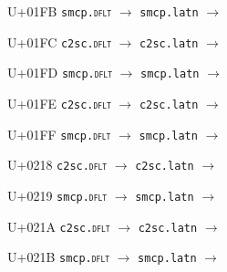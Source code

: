 \documentclass{article}
\begin{document}
\begin{substitutions}
\goodbreak

U+01FB  \linebreak
    \texttt{smcp.\textsc{dflt}} $\to$  \linebreak
    \texttt{smcp.latn} $\to$  

\goodbreak

U+01FC  \linebreak
    \texttt{c2sc.\textsc{dflt}} $\to$  \linebreak
    \texttt{c2sc.latn} $\to$  

\goodbreak

U+01FD  \linebreak
    \texttt{smcp.\textsc{dflt}} $\to$  \linebreak
    \texttt{smcp.latn} $\to$  

\goodbreak

U+01FE  \linebreak
    \texttt{c2sc.\textsc{dflt}} $\to$  \linebreak
    \texttt{c2sc.latn} $\to$  

\goodbreak

U+01FF  \linebreak
    \texttt{smcp.\textsc{dflt}} $\to$  \linebreak
    \texttt{smcp.latn} $\to$  

\goodbreak

U+0218  \linebreak
    \texttt{c2sc.\textsc{dflt}} $\to$  \linebreak
    \texttt{c2sc.latn} $\to$  

\goodbreak

U+0219  \linebreak
    \texttt{smcp.\textsc{dflt}} $\to$  \linebreak
    \texttt{smcp.latn} $\to$  

\goodbreak

U+021A  \linebreak
    \texttt{c2sc.\textsc{dflt}} $\to$  \linebreak
    \texttt{c2sc.latn} $\to$  

\goodbreak

U+021B  \linebreak
    \texttt{smcp.\textsc{dflt}} $\to$  \linebreak
    \texttt{smcp.latn} $\to$  


\end{substitutions}
\end{document}

